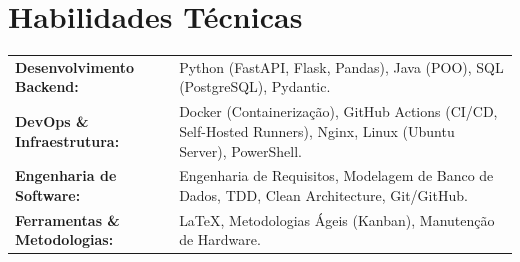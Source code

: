 \section*{Habilidades Técnicas}

\begin{tabularx}{0.96\textwidth}{@{}>{\bfseries}p{} >{\arraybackslash}X@{}}
    Desenvolvimento Backend: & Python (FastAPI, Flask, Pandas), Java (POO), SQL (PostgreSQL), Pydantic. \\
    DevOps \& Infraestrutura: & Docker (Containerização), GitHub Actions (CI/CD, Self-Hosted Runners), Nginx, Linux (Ubuntu Server), PowerShell. \\
    Engenharia de Software: & Engenharia de Requisitos, Modelagem de Banco de Dados, TDD, Clean Architecture, Git/GitHub. \\
    Ferramentas \& Metodologias: & \LaTeX, Metodologias Ágeis (Kanban), Manutenção de Hardware.
\end{tabularx}